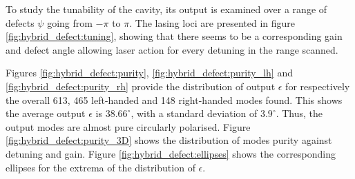 To study the tunability of the cavity, its output is examined over a range of defects $\psi$ going from $-\pi$ to $\pi$. The lasing loci are presented in figure \ref{fig:hybrid_defect:tuning}, showing that there seems to be a corresponding gain and defect angle allowing laser action for every detuning in the range scanned. 

Figures \ref{fig:hybrid_defect:purity}, \ref{fig:hybrid_defect:purity_lh} and \ref{fig:hybrid_defect:purity_rh} provide the distribution of output $\epsilon$ for respectively the overall 613, 465 left-handed and 148 right-handed modes found. This shows the average output $\epsilon$ is $38.66^\circ$, with a standard deviation of $3.9^\circ$. Thus, the output modes are almost pure circularly polarised. Figure \ref{fig:hybrid_defect:purity_3D} shows the distribution of modes purity against detuning and gain. Figure \ref{fig:hybrid_defect:ellipses} shows the corresponding ellipses for the extrema of the distribution of $\epsilon$.

